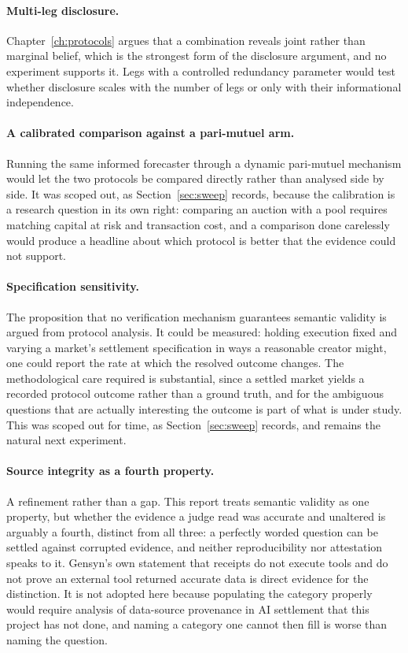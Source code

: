 \paragraph{Multi-leg disclosure.} Chapter~\ref{ch:protocols} argues that a combination
reveals joint rather than marginal belief, which is the strongest form of the disclosure
argument, and no experiment supports it. Legs with a controlled redundancy parameter would
test whether disclosure scales with the number of legs or only with their informational
independence.

\paragraph{A calibrated comparison against a pari-mutuel arm.} Running the same informed
forecaster through a dynamic pari-mutuel mechanism would let the two protocols be compared
directly rather than analysed side by side. It was scoped out, as Section~\ref{sec:sweep}
records, because the calibration is a research question in its own right: comparing an auction with a pool
requires matching capital at risk and transaction cost, and a comparison done carelessly
would produce a headline about which protocol is better that the evidence could not support.

\paragraph{Specification sensitivity.} The proposition that no verification mechanism
guarantees semantic validity is argued from protocol analysis. It could be measured: holding execution fixed and
varying a market's settlement specification in ways a reasonable creator might, one could
report the rate at which the resolved outcome changes. The methodological care required is
substantial, since a settled market yields a recorded protocol outcome rather than a ground
truth, and for the ambiguous questions that are actually interesting the outcome is part of
what is under study. This was scoped out for time, as Section~\ref{sec:sweep} records, and
remains the natural next experiment.

\paragraph{Source integrity as a fourth property.} A refinement rather than a gap. This report treats semantic validity as
one property, but whether the evidence a judge read was accurate and unaltered is arguably a
fourth, distinct from all three: a perfectly worded question can be settled against corrupted
evidence, and neither reproducibility nor attestation speaks to it. Gensyn's own statement
that receipts do not execute tools and do not prove an external tool returned accurate data
\cite{gensyn2026receipts} is direct evidence for the distinction. It is not adopted here
because populating the category properly would require analysis of data-source provenance in
AI settlement that this project has not done, and naming a category one cannot then fill is
worse than naming the question.

